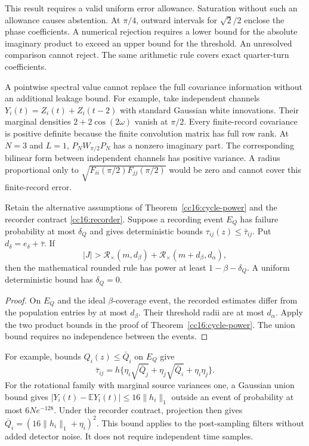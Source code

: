 This result requires a valid uniform error allowance. Saturation without such an allowance causes abstention. At $\pi/4$, outward intervals for $\sqrt2/2$ enclose the phase coefficients. A numerical rejection requires a lower bound for the absolute imaginary product to exceed an upper bound for the threshold. An unresolved comparison cannot reject. The same arithmetic rule covers exact quarter-turn coefficients.

A pointwise spectral value cannot replace the full covariance information without an additional leakage bound. For example, take independent channels $Y_i(t)=Z_i(t)+Z_i(t-2)$ with standard Gaussian white innovations. Their marginal densities $2+2\cos(2\omega)$ vanish at $\pi/2$. Every finite-record covariance is positive definite because the finite convolution matrix has full row rank. At $N=3$ and $L=1$, $P_NW_{\pi/2}P_N$ has a nonzero imaginary part. The corresponding bilinear form between independent channels has positive variance. A radius proportional only to $\sqrt{F_{ii}(\pi/2)F_{jj}(\pi/2)}$ would be zero and cannot cover this finite-record error.

\begin{proposition}
\label{cc16:rounded-cycle-power}
Retain the alternative assumptions of Theorem~\ref{cc16:cycle-power} and the recorder contract \eqref{cc16:recorder}. Suppose a recording event $E_Q$ has failure probability at most $\delta_Q$ and gives deterministic bounds $\tau_{ij}(z)\le\bar\tau_{ij}$. Put $d_\delta=e_\delta+\bar\tau$. If
\begin{equation}
 |J|>\mathcal R_\times(m,d_\beta)
       +\mathcal R_\times(m+d_\beta,d_\alpha),
 \label{cc16:rounded-cycle-power-condition}
\end{equation}
then the mathematical rounded rule has power at least $1-\beta-\delta_Q$. A uniform deterministic bound has $\delta_Q=0$.
\end{proposition}
\begin{proof}
On $E_Q$ and the ideal $\beta$-coverage event, the recorded estimates differ from the population entries by at most $d_\beta$. Their threshold radii are at most $d_\alpha$. Apply the two product bounds in the proof of Theorem~\ref{cc16:cycle-power}. The union bound requires no independence between the events.
\end{proof}

For example, bounds $Q_i(z)\le\bar Q_i$ on $E_Q$ give
\[
 \bar\tau_{ij}=h\{\eta_i\sqrt{\bar Q_j}
                    +\eta_j\sqrt{\bar Q_i}+\eta_i\eta_j\}.
\]
For the rotational family with marginal source variances one, a Gaussian union bound gives $|Y_i(t)-\mathbb EY_i(t)|\le16\|h_i\|_1$ outside an event of probability at most $6Ne^{-128}$. Under the recorder contract, projection then gives $\bar Q_i=(16\|h_i\|_1+\eta_i)^2$. This bound applies to the post-sampling filters without added detector noise. It does not require independent time samples.

